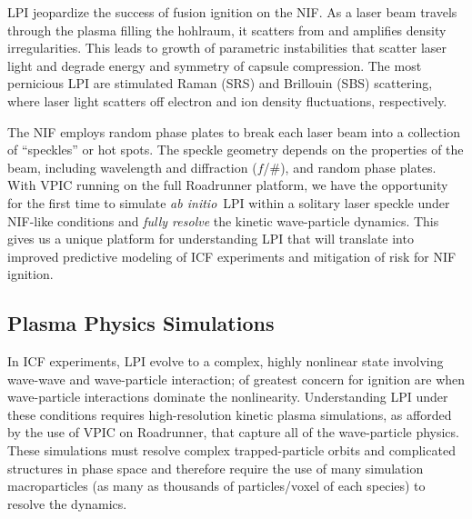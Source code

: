 \documentclass[10pt]{article}
\newcommand{\abinitio} {\textit{ab initio}}
\begin{document}
LPI jeopardize the success of fusion ignition on the NIF.  As a laser
beam travels through the plasma filling the hohlraum, it scatters from
and amplifies density irregularities.  This leads to growth of
parametric instabilities that scatter laser light and degrade energy
and symmetry of capsule compression.  The most pernicious LPI are
stimulated Raman (SRS) and Brillouin (SBS) scattering, where laser
light scatters off electron and ion density fluctuations,
respectively.

The NIF employs random phase plates to break each laser beam into a
collection of ``speckles'' or hot spots.  The speckle geometry depends
on the properties of the beam, including wavelength and diffraction
($f$/\#), and random phase plates.  With VPIC running on the full
Roadrunner platform, we have the opportunity for the first time to
simulate \abinitio\ LPI within a solitary laser speckle under NIF-like
conditions and \textit{fully resolve} the kinetic wave-particle
dynamics.  This gives us a unique platform for understanding LPI that
will translate into improved predictive modeling of ICF experiments
and mitigation of risk for NIF ignition.

%
%
\subsection{Plasma Physics Simulations}

In ICF experiments, LPI evolve to a complex, highly nonlinear state
involving wave-wave and wave-particle interaction; of greatest concern
for ignition are when wave-particle interactions dominate the
nonlinearity.  Understanding LPI under these conditions requires
high-resolution kinetic plasma simulations, as afforded by the use of
VPIC on Roadrunner, that capture all of the wave-particle physics.
These simulations must resolve complex trapped-particle orbits and
complicated structures in phase space and therefore require the use of
many simulation macroparticles (as many as thousands of
particles/voxel of each species) to resolve the
dynamics.~\cite{Yin_et_al_Phys_Plasmas_2006}
\end{document}
